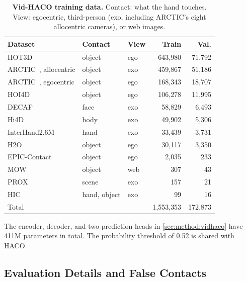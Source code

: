 \begin{table}[t]
\centering\footnotesize
\caption{\textbf{Vid-HACO training data.} Contact: what the hand touches. View: egocentric, third-person (exo, including ARCTIC's eight allocentric cameras), or web images.}
\label{tab:vidhaco_data}
\setlength{\tabcolsep}{4pt}
\begin{tabular}{@{}lllrr@{}}
\toprule
Dataset & Contact & View & Train & Val. \\
\midrule
HOT3D~\citep{hot3d} & object & ego & 643{,}980 & 71{,}792 \\
ARCTIC~\citep{arctic}, allocentric & object & exo & 459{,}867 & 51{,}186 \\
ARCTIC~\citep{arctic}, egocentric & object & ego & 168{,}343 & 18{,}707 \\
HOI4D~\citep{hoi4d} & object & ego & 106{,}278 & 11{,}995 \\
DECAF~\citep{decaf} & face & exo & 58{,}829 & 6{,}493 \\
Hi4D~\citep{hi4d} & body & exo & 49{,}902 & 5{,}306 \\
InterHand2.6M~\citep{interhand} & hand & exo & 33{,}439 & 3{,}731 \\
H2O~\citep{h2ohands} & object & ego & 30{,}117 & 3{,}350 \\
EPIC-Contact~\citep{epiccontact} & object & ego & 2{,}035 & 233 \\
MOW~\citep{mow} & object & web & 307 & 43 \\
PROX~\citep{prox} & scene & exo & 157 & 21 \\
HIC~\citep{hic} & hand, object & exo & 99 & 16 \\
\midrule
Total & & & 1{,}553{,}353 & 172{,}873 \\
\bottomrule
\end{tabular}
\end{table}

 The encoder, decoder, and two prediction heads in \cref{sec:method:vidhaco} have 411M parameters in total. The probability threshold of 0.52 is shared with HACO.

\subsection{Evaluation Details and False Contacts}
\label{app:contact}

